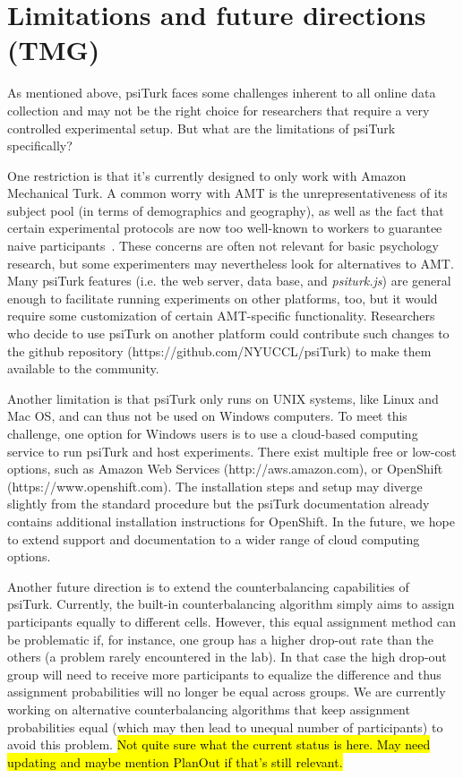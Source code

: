 \documentclass[twocolumn]{svjour3}          %
\newcommand{\psiturk}[0]{\textsf{psiTurk}}
\newcommand{\psiturkjs}[0]{\emph{psiturk.js}}
\begin{document}
\section{Limitations and future directions (TMG)}

As mentioned above, \psiturk{} faces some challenges inherent to all online data collection and may not be the right choice for
researchers that require a very controlled experimental setup. But what are the limitations of \psiturk{} specifically?

One restriction is that it's currently designed to only work with Amazon Mechanical Turk. A common worry with AMT is the unrepresentativeness of
its subject pool (in terms of demographics and geography), as well as the fact that certain experimental protocols are now too well-known 
to workers to guarantee naive
participants~\citep{chandler2014nonnaivete}. These concerns are often not relevant for basic psychology research, but some experimenters may nevertheless
look for alternatives to AMT. Many \psiturk{} features (i.e. the web server, data base, and \psiturkjs{}) are general
enough to facilitate running experiments on other platforms, too, but it would require some customization of certain AMT-specific functionality. 
Researchers who decide
to use \psiturk{} on another platform could contribute such changes to the github repository (\textsf{https://github.com/NYUCCL/psiTurk}) to make them
available to the community.


Another limitation is that \psiturk{} only runs on UNIX systems, like Linux and Mac OS, and can thus not be used on Windows computers. To meet this 
challenge, one option for Windows users is to use a cloud-based computing service to run \psiturk{} and host experiments. There exist
multiple free or low-cost options, such as Amazon Web Services (\textsf{http://aws.amazon.com}), or OpenShift (\textsf{https://www.openshift.com}). 
The installation steps and setup may diverge slightly from the standard procedure but 
 the \psiturk{} documentation already contains additional installation instructions for OpenShift. In the future, we hope to extend support  and 
documentation to a wider range of cloud computing options.

Another future direction is to extend the counterbalancing capabilities of \psiturk{}. Currently, the built-in counterbalancing algorithm
simply aims to assign participants equally to different cells.  However, this equal assignment method can be problematic if, for instance, 
one group has a higher drop-out rate than the others (a problem rarely encountered in the lab). 
In that case the high drop-out group will need to receive
more participants to equalize the difference and thus assignment probabilities will no longer be equal across groups. We are
currently working on alternative counterbalancing algorithms that keep assignment probabilities equal (which may then lead to unequal
number of participants) to avoid this problem. \hl{Not quite sure what the current status is here. May need updating and maybe mention PlanOut
if that's still relevant.}
\end{document}
